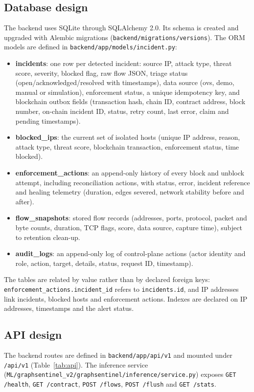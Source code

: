 \documentclass[12pt,a4paper]{report}
\begin{document}
\subsection{Database design}
The backend uses SQLite through SQLAlchemy 2.0. Its schema is created and upgraded with Alembic migrations (\texttt{backend/\allowbreak{}migrations/\allowbreak{}versions}). The ORM models are defined in \texttt{backend/\allowbreak{}app/\allowbreak{}models/\allowbreak{}incident.\allowbreak{}py}:
\begin{itemize}
    \item \textbf{incidents}: one row per detected incident: source IP, attack type, threat score, severity, blocked flag, raw flow JSON, triage status (open/acknowledged/resolved with timestamps), data source (ovs, demo, manual or simulation), enforcement status, a unique idempotency key, and blockchain outbox fields (transaction hash, chain ID, contract address, block number, on-chain incident ID, status, retry count, last error, claim and pending timestamps).
    \item \textbf{blocked\_ips}: the current set of isolated hosts (unique IP address, reason, attack type, threat score, blockchain transaction, enforcement status, time blocked).
    \item \textbf{enforcement\_actions}: an append-only history of every block and unblock attempt, including reconciliation actions, with status, error, incident reference and healing telemetry (duration, edges severed, network stability before and after).
    \item \textbf{flow\_snapshots}: stored flow records (addresses, ports, protocol, packet and byte counts, duration, TCP flags, score, data source, capture time), subject to retention clean-up.
    \item \textbf{audit\_logs}: an append-only log of control-plane actions (actor identity and role, action, target, details, status, request ID, timestamp).
\end{itemize}
The tables are related by value rather than by declared foreign keys: \texttt{enforcement\_\allowbreak{}actions.\allowbreak{}incident\_\allowbreak{}id} refers to \texttt{incidents.id}, and IP addresses link incidents, blocked hosts and enforcement actions. Indexes are declared on IP addresses, timestamps and the alert status.

\subsection{API design}
The backend routes are defined in \texttt{backend/\allowbreak{}app/\allowbreak{}api/\allowbreak{}v1} and mounted under \texttt{/\allowbreak{}api/\allowbreak{}v1} (Table~\ref{tab:api}). The inference service (\texttt{ML/\allowbreak{}graphsentinel\_\allowbreak{}v2/\allowbreak{}graphsentinel/\allowbreak{}inference/\allowbreak{}service.\allowbreak{}py}) exposes \texttt{GET /\allowbreak{}health}, \texttt{GET /\allowbreak{}contract}, \texttt{POST /\allowbreak{}flows}, \texttt{POST /\allowbreak{}flush} and \texttt{GET /\allowbreak{}stats}.
\end{document}
